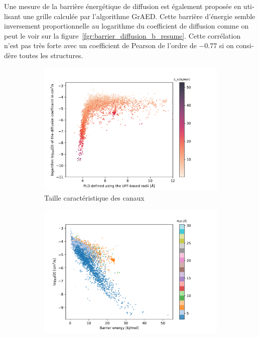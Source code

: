 \documentclass[thesis]{subfiles}
\begin{document}
\begin{otherlanguage}{french}
Une mesure de la barrière énergétique de diffusion est également proposée en utilisant une grille calculée par l'algorithme GrAED. Cette barrière d'énergie semble inversement proportionnelle au logarithme du coefficient de diffusion comme on peut le voir sur la figure~\ref{fgr:barrier_diffusion_b_resume}. Cette corrélation n'est pas très forte avec un coefficient de Pearson de l'ordre de $-0.77$ si on considère toutes les structures. 

\begin{figure}[hb]
  \centering
  \begin{subfigure}[b]{0.48\textwidth}
      \centering
      \includegraphics[width=\textwidth]{figures/5-diffusion/difflog_Df-uff298K_barrier.pdf}
      \caption{Taille caractéristique des canaux}\label{fgr:barrier_diffusion_a_resume}
  \end{subfigure}
  \hfill
  \begin{subfigure}[b]{0.48\textwidth}
      \centering
      \includegraphics[width=\textwidth]{figures/5-diffusion/difflog_barrier_Df_uff.pdf}

\end{subfigure}
\end{figure}
\end{otherlanguage}
\end{document}
